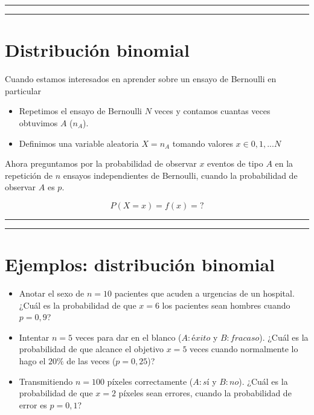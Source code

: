 \documentclass[
]{book}
\begin{document}
\begin{center}\rule{0.5\linewidth}{0.5pt}\end{center}

\begin{center}\rule{0.5\linewidth}{0.5pt}\end{center}

\hypertarget{distribuciuxf3n-binomial}{%
\section{Distribución binomial}\label{distribuciuxf3n-binomial}}

Cuando estamos interesados \hspace{0pt}\hspace{0pt}en aprender sobre un ensayo de Bernoulli en particular

\begin{itemize}
\item
  Repetimos el ensayo de Bernoulli \(N\) veces y contamos cuantas veces obtuvimos \(A\) (\(n_A\)).
\item
  Definimos una variable aleatoria \(X=n_A\) tomando valores \(x \in {0,1,...N}\)
\end{itemize}

Ahora preguntamos por la probabilidad de observar \(x\) eventos de tipo \(A\) en la repetición de \(n\) ensayos independientes de Bernoulli, cuando la probabilidad de observar \(A\) es \(p\).

\[P(X=x)=f(x)=?\]

\begin{center}\rule{0.5\linewidth}{0.5pt}\end{center}

\begin{center}\rule{0.5\linewidth}{0.5pt}\end{center}

\hypertarget{ejemplos-distribuciuxf3n-binomial}{%
\section{Ejemplos: distribución binomial}\label{ejemplos-distribuciuxf3n-binomial}}

\begin{itemize}
\item
  Anotar el sexo de \(n=10\) pacientes que acuden a urgencias de un hospital. ¿Cuál es la probabilidad de que \(x=6\) los pacientes sean hombres cuando \(p=0,9\)?
\item
  Intentar \(n=5\) veces para dar en el blanco (\(A:éxito\) y \(B:fracaso\)). ¿Cuál es la probabilidad de que alcance el objetivo \(x=5\) veces cuando normalmente lo hago el \(20\%\) de las veces (\(p=0,25\))?
\item
  Transmitiendo \(n=100\) píxeles correctamente (\(A:sí\) y \(B:no\)). ¿Cuál es la probabilidad de que \(x=2\) píxeles sean errores, cuando la probabilidad de error es \(p=0,1\)?
\end{itemize}
\end{document}
